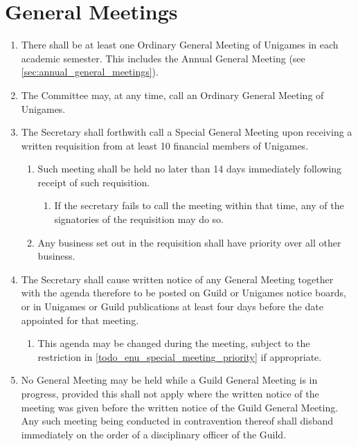 \documentclass[a4paper]{article}
\begin{document}
\section{General Meetings} \label{sec:general_meetings}
\begin{enumerate}
    \item There shall be at least one Ordinary General Meeting of Unigames in each academic semester. This includes the Annual General Meeting (see \cref{sec:annual_general_meetings}).
    \item The Committee may, at any time, call an Ordinary General Meeting of Unigames.
    \item The Secretary shall forthwith call a Special General Meeting upon receiving a written requisition from at least 10 financial members of Unigames.
          \begin{enumerate}
              \item Such meeting shall be held no later than 14 days immediately following receipt of such requisition.
                    \begin{enumerate}
                        \item If the secretary fails to call the meeting within that time, any of the signatories of the requisition may do so.
                    \end{enumerate}
              \item \label{todo_enu_special_meeting_priority} Any business set out in the requisition shall have priority over all other business.
          \end{enumerate}
    \item The Secretary shall cause written notice of any General Meeting together with the agenda therefore to be posted on Guild or Unigames notice boards, or in Unigames or Guild publications at least four days before the date appointed for that meeting.
          \begin{enumerate}
              \item This agenda may be changed during the meeting, subject to the restriction in \cref{todo_enu_special_meeting_priority} if appropriate.
          \end{enumerate}
    \item No General Meeting may be held while a Guild General Meeting is in progress, provided this shall not apply where the written notice of the meeting was given before the written notice of the Guild General Meeting. Any such meeting being conducted in contravention thereof shall disband immediately on the order of a disciplinary officer of the Guild.

\end{enumerate}
\end{document}
